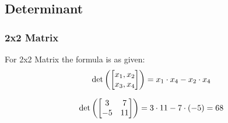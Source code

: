 \subsection{Determinant}
\subsubsection{2x2 Matrix}
For 2x2 Matrix the formula is as given:
\begin{align*}
    \det \left( \begin{bmatrix}
            x_1, x_2 \\
            x_3, x_4 \\
        \end{bmatrix} \right) = x_1 \cdot x_4 - x_2 \cdot x_4
\end{align*}
\begin{example}
    \begin{align*}
        \det \left( 
            \begin{bmatrix}
                3 & 7 \\ -5 & 11
            \end{bmatrix}
         \right) = 3 \cdot 11 - 7 \cdot (-5) = 68
    \end{align*}
\end{example}
